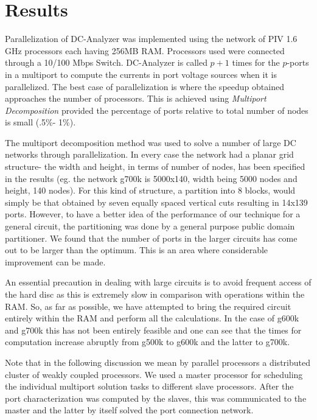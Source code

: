 \documentclass[12pt,psfig,a4]{article}
\begin{document}
\section{Results}

Parallelization of DC-Analyzer was implemented using the network of PIV 1.6 GHz processors each having 
256MB RAM. Processors used were connected through a 10/100 Mbps Switch. 
DC-Analyzer is called $p+1$ times for the $p$-ports in a multiport to compute the currents in port voltage
sources when it is parallelized. 
The best case of parallelization is where the speedup obtained approaches the number of processors. This is achieved 
using {\it Multiport Decomposition} provided the percentage of ports relative to total number of nodes is small 
(.5$\%$- 1$\%$).\par

The multiport decomposition method was used to solve a number of large DC
networks through parallelization. In every case the network had a planar grid structure-
the width and height, in terms of number of nodes, has been specified in the
results (eg. the network g700k is 5000x140, width being 5000 nodes and 
height, 140 nodes). 
For this kind of structure, a partition into 8 blocks, 
would simply be that obtained by seven equally spaced vertical cuts resulting in 14x139 ports. 
However, to have a better idea of the performance of our technique
for a general circuit, the  partitioning was done by a general purpose
public domain partitioner. We found that the number of ports in the larger
circuits has come out to be larger than the optimum. This is an area where
considerable improvement can be made.\par
An essential precaution in dealing with large circuits is to avoid frequent access of
the hard disc as this is extremely slow in comparison with operations within the RAM.
So, as far as possible, we have attempted to bring the required circuit entirely
within the RAM and perform all the calculations. In the case of g600k and g700k this has 
not been entirely feasible and one can see that the times for computation increase
abruptly from g500k to g600k and the latter to g700k.

Note that in the following discussion we mean by parallel processors a distributed cluster of
weakly coupled processors. 
We used a master processor for scheduling the individual multiport
solution tasks to different slave processors. After the port characterization
was computed by the slaves, this was communicated to the master and the latter
by itself solved the port connection network.\par
\end{document}
